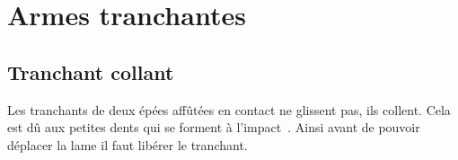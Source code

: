 \chapter{Armes tranchantes}


\section{Tranchant collant}
\label{sec:armes-tranchantes:tranchant-collant}

Les tranchants de deux épées affûtées en contact ne glissent pas, ils collent.
Cela est dû aux petites dents qui se forment à l'impact~\cite{Youtube:Warzecha:2014:SharpSword, fuhrmann:dijon:I33_liage:2015}.
Ainsi avant de pouvoir déplacer la lame il faut libérer le tranchant.


